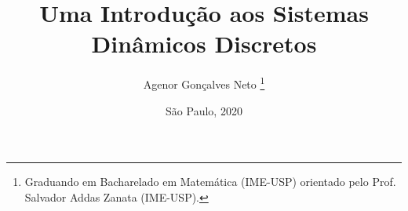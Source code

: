 \documentclass[a4paper, 11pt]{article}
\title{Uma Introdução aos Sistemas Dinâmicos Discretos}
\author{Agenor Gonçalves Neto \footnote{Graduando em Bacharelado em Matemática (IME-USP) orientado pelo Prof. Salvador Addas Zanata (IME-USP).}}
\date{São Paulo, 2020}
\theoremstyle{definition}
\theoremstyle{plain}
\begin{document}
\maketitle
\tableofcontents













\nocite{burns, devaney, holmgren}


\end{document}
